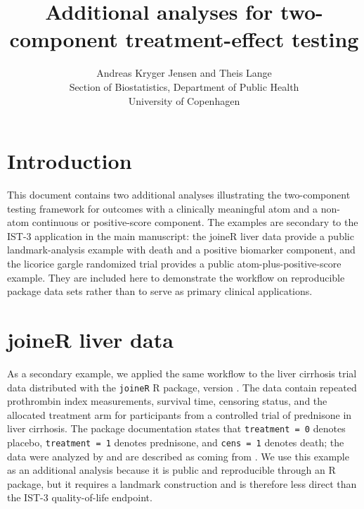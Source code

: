 \documentclass[11pt]{article}
\title{Additional analyses for two-component treatment-effect testing}
\author{
  Andreas Kryger Jensen and Theis Lange\\
  Section of Biostatistics, Department of Public Health\\
  University of Copenhagen
}
\date{}
\begin{document}
\maketitle

\section*{Introduction}

This document contains two additional analyses illustrating the two-component testing framework for outcomes with a clinically meaningful atom and a non-atom continuous or positive-score component. The examples are secondary to the IST-3 application in the main manuscript: the joineR liver data provide a public landmark-analysis example with death and a positive biomarker component, and the licorice gargle randomized trial provides a public atom-plus-positive-score example. They are included here to demonstrate the workflow on reproducible package data sets rather than to serve as primary clinical applications.

\section{joineR liver data}\label{app:joiner-liver-application}

As a secondary example, we applied the same workflow to the liver cirrhosis trial data distributed with the \texttt{joineR} R package, version \LiverAppendixPackageVersion{} \citep{joineRPackage}. The data contain repeated prothrombin index measurements, survival time, censoring status, and the allocated treatment arm for \LiverAppendixRandomizedN{} participants from a controlled trial of prednisone in liver cirrhosis. The package documentation states that \texttt{treatment = 0} denotes placebo, \texttt{treatment = 1} denotes prednisone, and \texttt{cens = 1} denotes death; the data were analyzed by \citet{henderson2002identification} and are described as coming from \citet{andersen2003statistical}. We use this example as an additional analysis because it is public and reproducible through an R package, but it requires a landmark construction and is therefore less direct than the IST-3 quality-of-life endpoint.
\end{document}
